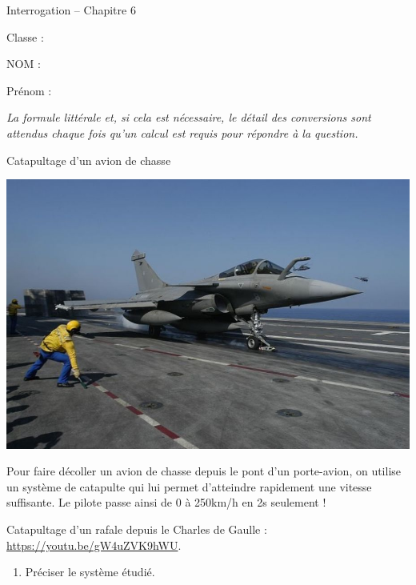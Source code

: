 \documentclass[12pt,a4paper]{article}
\begin{document}
\begin{header}
Interrogation -- Chapitre 6

\normalsize
\flushleft
\begin{doublespace}
Classe :

NOM :

\end{doublespace}
Prénom : 
\end{header}

\emph{La formule littérale et, si cela est nécessaire, le détail des conversions sont attendus chaque fois qu'un calcul est requis pour répondre à la question.}

\begin{exo}{Catapultage d'un avion de chasse}

\begin{multicols}{2}
\begin{center}
\includegraphics[trim={0 4cm 0 4cm}, clip, width=\linewidth]{images/rafale.jpg}
\end{center}

Pour faire décoller un avion de chasse depuis le pont d'un porte-avion, on utilise un système de catapulte qui lui permet d'atteindre rapidement une vitesse suffisante.
Le pilote passe ainsi de $0$ à \unit{250}{km/h} en \unit{2}{s} seulement !

Catapultage d'un rafale depuis le Charles de Gaulle : \href{https://youtu.be/gW4uZVK9hWU}{https://youtu.be/gW4uZVK9hWU}.
\end{multicols}

\begin{enumerate}
\item \app{} 

Préciser le système étudié.


\end{enumerate}
\end{exo}
\end{document}
